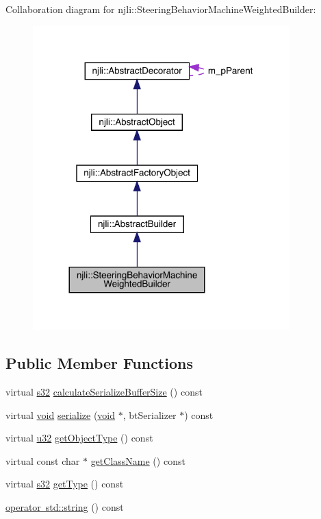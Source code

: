 Collaboration diagram for njli\+:\+:Steering\+Behavior\+Machine\+Weighted\+Builder\+:\nopagebreak
\begin{figure}[H]
\begin{center}
\leavevmode
\includegraphics[width=281pt]{classnjli_1_1_steering_behavior_machine_weighted_builder__coll__graph}
\end{center}
\end{figure}
\subsection*{Public Member Functions}
\begin{DoxyCompactItemize}
\item 
virtual \mbox{\hyperlink{_util_8h_aa62c75d314a0d1f37f79c4b73b2292e2}{s32}} \mbox{\hyperlink{classnjli_1_1_steering_behavior_machine_weighted_builder_a01e0a799f25f332ebcbb642a4d39b9ab}{calculate\+Serialize\+Buffer\+Size}} () const
\item 
virtual \mbox{\hyperlink{_thread_8h_af1e856da2e658414cb2456cb6f7ebc66}{void}} \mbox{\hyperlink{classnjli_1_1_steering_behavior_machine_weighted_builder_ae5bca162b52a56eb8369e770e2af4c31}{serialize}} (\mbox{\hyperlink{_thread_8h_af1e856da2e658414cb2456cb6f7ebc66}{void}} $\ast$, bt\+Serializer $\ast$) const
\item 
virtual \mbox{\hyperlink{_util_8h_a10e94b422ef0c20dcdec20d31a1f5049}{u32}} \mbox{\hyperlink{classnjli_1_1_steering_behavior_machine_weighted_builder_a7aa7a8620c6f8990966ca4076e1cbffa}{get\+Object\+Type}} () const
\item 
virtual const char $\ast$ \mbox{\hyperlink{classnjli_1_1_steering_behavior_machine_weighted_builder_a76a5cedafd99c9c5b238f59de83e7e2f}{get\+Class\+Name}} () const
\item 
virtual \mbox{\hyperlink{_util_8h_aa62c75d314a0d1f37f79c4b73b2292e2}{s32}} \mbox{\hyperlink{classnjli_1_1_steering_behavior_machine_weighted_builder_acb1572c7c6a1b2775f27af36a57eae0f}{get\+Type}} () const
\item 
\mbox{\hyperlink{classnjli_1_1_steering_behavior_machine_weighted_builder_aae53f09dd583f236b455f9e262e208a5}{operator std\+::string}} () const
\end{DoxyCompactItemize}
